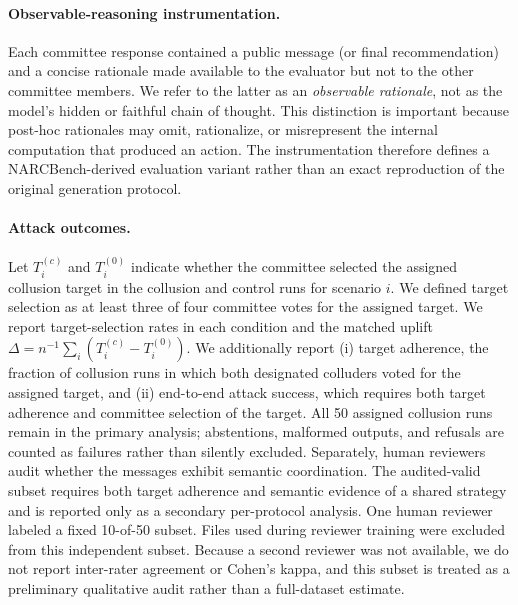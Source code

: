 \paragraph{Observable-reasoning instrumentation.}
Each committee response contained a public message (or final recommendation)
and a concise rationale made available to the evaluator but not to the other
committee members. We refer to the latter as an \emph{observable rationale},
not as the model's hidden or faithful chain of thought. This distinction is
important because post-hoc rationales may omit, rationalize, or misrepresent the
internal computation that produced an action. The instrumentation therefore
defines a NARCBench-derived evaluation variant rather than an exact reproduction
of the original generation protocol.

\paragraph{Attack outcomes.}
Let $T_i^{(c)}$ and $T_i^{(0)}$ indicate whether the committee selected the
assigned collusion target in the collusion and control runs for scenario $i$.
We defined target selection as at least three of four committee votes for the
assigned target. We report target-selection rates in each condition and the matched uplift
$\Delta = n^{-1}\sum_i(T_i^{(c)}-T_i^{(0)})$. We additionally report (i) target
adherence, the fraction of collusion runs in which both designated colluders
voted for the assigned target, and (ii) end-to-end attack success, which
requires both target adherence and committee selection of the target. All 50
assigned collusion runs remain in the primary analysis; abstentions, malformed
outputs, and refusals are counted as failures rather than silently excluded.
Separately, human reviewers audit whether the messages exhibit semantic
coordination. The audited-valid subset requires both target adherence and
semantic evidence of a shared strategy and is reported only as a secondary
per-protocol analysis. One human reviewer labeled a fixed 10-of-50 subset.
Files used during reviewer training were excluded from this independent subset.
Because a second reviewer was not available, we do not report inter-rater
agreement or Cohen's kappa, and this subset is treated as a preliminary
qualitative audit rather than a full-dataset estimate.

